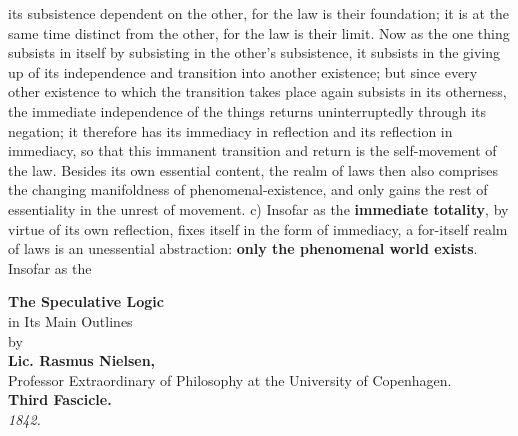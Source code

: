 \documentclass[12pt,a4paper,openany]{book}
\begin{document}
its subsistence dependent on the other, for the law is
their foundation; it is at the same time distinct from the
other, for the law is their limit. Now as the
one thing subsists in itself by subsisting in the
other's subsistence, it subsists in the giving up of
its independence and transition into another existence;
but since every other existence to which
the transition takes place again subsists in its otherness,
the immediate independence of the things returns
uninterruptedly through its negation; it therefore has
its immediacy in reflection and its reflection
in immediacy, so that this immanent
transition and return is the self-movement of the law.
Besides its own essential content, the realm of laws
then also comprises the changing manifoldness
of phenomenal-existence, and only gains the rest of essentiality
in the unrest of movement.
c) Insofar as the \textbf{immediate totality}, by virtue
of its own reflection, fixes itself in the form of immediacy,
a for-itself realm of
laws is an unessential abstraction: \textbf{only the phenomenal world exists}. Insofar as the

\medskip
{}

\clearpage
\begin{center}
\vspace*{4em}
{\Huge\textbf{The Speculative Logic}}\\[1em]
{\Large in Its Main Outlines}\\[1em]
by\\[1em]
{\Large\textbf{Lic. Rasmus Nielsen,}}\\[0.5em]
Professor Extraordinary of Philosophy at the University of Copenhagen.\\[2em]
{\large\textbf{Third Fascicle.}}\\[1em]
\textit{1842.}
\end{center}
\end{document}
